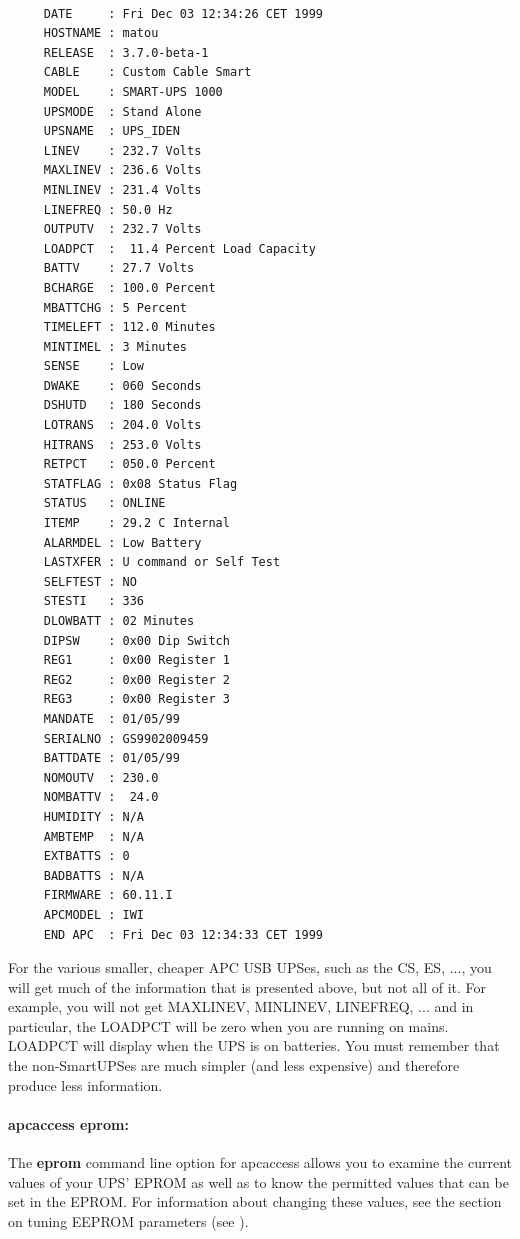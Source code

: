 {{{{\footnotesize
\begin{verbatim}
     
     DATE     : Fri Dec 03 12:34:26 CET 1999
     HOSTNAME : matou
     RELEASE  : 3.7.0-beta-1
     CABLE    : Custom Cable Smart
     MODEL    : SMART-UPS 1000
     UPSMODE  : Stand Alone
     UPSNAME  : UPS_IDEN
     LINEV    : 232.7 Volts
     MAXLINEV : 236.6 Volts
     MINLINEV : 231.4 Volts
     LINEFREQ : 50.0 Hz
     OUTPUTV  : 232.7 Volts
     LOADPCT  :  11.4 Percent Load Capacity
     BATTV    : 27.7 Volts
     BCHARGE  : 100.0 Percent
     MBATTCHG : 5 Percent
     TIMELEFT : 112.0 Minutes
     MINTIMEL : 3 Minutes
     SENSE    : Low
     DWAKE    : 060 Seconds
     DSHUTD   : 180 Seconds
     LOTRANS  : 204.0 Volts
     HITRANS  : 253.0 Volts
     RETPCT   : 050.0 Percent
     STATFLAG : 0x08 Status Flag
     STATUS   : ONLINE
     ITEMP    : 29.2 C Internal
     ALARMDEL : Low Battery
     LASTXFER : U command or Self Test
     SELFTEST : NO
     STESTI   : 336
     DLOWBATT : 02 Minutes
     DIPSW    : 0x00 Dip Switch
     REG1     : 0x00 Register 1
     REG2     : 0x00 Register 2
     REG3     : 0x00 Register 3
     MANDATE  : 01/05/99
     SERIALNO : GS9902009459
     BATTDATE : 01/05/99
     NOMOUTV  : 230.0
     NOMBATTV :  24.0
     HUMIDITY : N/A
     AMBTEMP  : N/A
     EXTBATTS : 0
     BADBATTS : N/A
     FIRMWARE : 60.11.I
     APCMODEL : IWI
     END APC  : Fri Dec 03 12:34:33 CET 1999
\end{verbatim}
\normalsize

For the various smaller, cheaper APC USB UPSes, such as the CS, ES, ..., you
will get much of the information that is presented above, but not all of it.
For example, you will not get MAXLINEV, MINLINEV, LINEFREQ, ... and in
particular, the LOADPCT will be zero when you are running on mains. LOADPCT
will display when the UPS is on batteries.  You must remember that the
non-SmartUPSes are much simpler (and less expensive) and therefore produce
less information. 

\label{apcaccess-eprom}

\paragraph*{apcaccess eprom:}

\label{index-apcaccess-eeprom-114}
\label{index-eeprom_002c-apcaccess-115}
The {\bf eprom} command line option for apcaccess allows you to examine the
current values of your UPS' EPROM as well as to know the permitted values that
can be set in the EPROM. For information about changing these values, see the
section on tuning EEPROM parameters (see 
).  

}}}}
